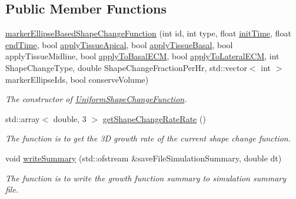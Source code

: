 \subsection*{Public Member Functions}
\begin{DoxyCompactItemize}
\item 
\hyperlink{classmarkerEllipseBasedShapeChangeFunction_a672deb17c0ad66c4bc59aec927c48322}{marker\+Ellipse\+Based\+Shape\+Change\+Function} (int id, int type, float \hyperlink{classGrowthFunctionBase_ae92513a7b41637df8e26e7db35ddf97c}{init\+Time}, float \hyperlink{classGrowthFunctionBase_a3ff4db0573d354a75666a5f3ca446941}{end\+Time}, bool \hyperlink{classGrowthFunctionBase_a254c82be25d3648a0474c24a63d5a555}{apply\+Tissue\+Apical}, bool \hyperlink{classGrowthFunctionBase_afcbfd4691a386ba9dbf75888e0a4ef9e}{apply\+Tissue\+Basal}, bool apply\+Tissue\+Midline, bool \hyperlink{classGrowthFunctionBase_a9fe46fc6dde4041b79204beb48972a09}{apply\+To\+Basal\+E\+C\+M}, bool \hyperlink{classGrowthFunctionBase_ac623b1dbe376bce5dddbe1a2e21c776f}{apply\+To\+Lateral\+E\+C\+M}, int Shape\+Change\+Type, double Shape\+Change\+Fraction\+Per\+Hr, std\+::vector$<$ int $>$ marker\+Ellipse\+Ids, bool conserve\+Volume)
\begin{DoxyCompactList}\small\item\em The constructor of \hyperlink{classUniformShapeChangeFunction}{Uniform\+Shape\+Change\+Function}. \end{DoxyCompactList}\item 
std\+::array$<$ double, 3 $>$ \hyperlink{classmarkerEllipseBasedShapeChangeFunction_aec4b322a254ca55b61604580197562fb}{get\+Shape\+Change\+Rate\+Rate} ()
\begin{DoxyCompactList}\small\item\em The function is to get the 3\+D growth rate of the current shape change function. \end{DoxyCompactList}\item 
void \hyperlink{classmarkerEllipseBasedShapeChangeFunction_aa4e6bc480cea0b02f2beb8521e6aca91}{write\+Summary} (std\+::ofstream \&save\+File\+Simulation\+Summary, double dt)
\begin{DoxyCompactList}\small\item\em The function is to write the growth function summary to simulation summary file. \end{DoxyCompactList}\end{DoxyCompactItemize}
